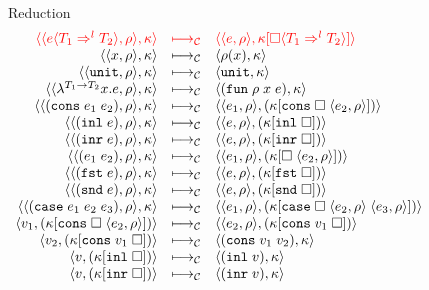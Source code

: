 \documentclass[acmsmall,review,anonymous]{acmart}\settopmatter{printfolios=true,printccs=false,printacmref=false}
\newcommand{\sOOinspect}[3]{\langle\langle#1,#2\rangle,#3\rangle}
\newcommand{\sOOreturn}[2]{\langle#1,#2\rangle}
\newcommand{\eOOvar}[1]{#1}
\newcommand{\eOOsole}[0]{\mathtt{unit}}
\newcommand{\eOOlam}[4]{\lambda^{#1\rightarrow{}#2}#3.#4}
\newcommand{\eOOapp}[2]{#1 \; #2}
\newcommand{\eOOcons}[2]{\mathtt{cons} \; #1 \; #2}
\newcommand{\eOOcar}[1]{\mathtt{fst} \; #1}
\newcommand{\eOOcdr}[1]{\mathtt{snd} \; #1}
\newcommand{\eOOinl}[1]{\mathtt{inl} \; #1}
\newcommand{\eOOinr}[1]{\mathtt{inr} \; #1}
\newcommand{\eOOcase}[3]{\mathtt{case} \; #1 \; #2 \; #3}
\newcommand{\eOOcast}[4]{#1 \langle \cOOcast{#2}{#3}{#4} \rangle}
\newcommand{\cOOcast}[3]{#1 \Rightarrow^{#2} #3}
\newcommand{\vOOfun}[3]{\mathtt{fun} \; #1 \; #2 \; #3}
\newcommand{\vOOtt}[0]{\mathtt{unit}}
\newcommand{\vOOcons}[2]{\mathtt{cons}\;#1\;#2}
\newcommand{\vOOinl}[1]{\mathtt{inl}\;#1}
\newcommand{\vOOinr}[1]{\mathtt{inr}\;#1}
\newcommand{\kOOconsI}[3]{#3[\mathtt{cons} \; \square \; \langle#1,#2\rangle ]}
\newcommand{\kOOconsII}[2]{#2[\mathtt{cons} \; #1 \; \square]}
\newcommand{\kOOinl}[1]{#1[\mathtt{inl} \; \square]}
\newcommand{\kOOinr}[1]{#1[\mathtt{inr} \; \square]}
\newcommand{\kOOappI}[3]{
	#3[\square \; \langle#1,#2\rangle ]
}
\newcommand{\kOOcar}[1]{#1[\mathtt{fst} \; \square]}
\newcommand{\kOOcdr}[1]{#1[\mathtt{snd} \; \square]}
\newcommand{\kOOcaseI}[4]{
	#4[\mathtt{case} \; \square \; \langle#1,#3\rangle \; \langle#2,#3\rangle ]}
\newcommand{\kOOcast}[2]{
	#2[\square \langle #1 \rangle]}
\newcommand{\judgeCreduce}[2]{#1 \longmapsto_{\mathcal{C}} #2}
\newcommand{\redrule}[3]{#1 & \longmapsto_\mathcal{C} & #2 & #3\\}
\newcommand{\hiredrule}[3]{\highlight{#1} & \highlight{\longmapsto_\mathcal{C}} & \highlight{#2} & \highlight{#3} \\}
\newcommand{\highlight}[1]{{\color{red} #1}}
\begin{document}
\begin{figure}
	
	\[
	\begin{array}{rclr}
	\end{array}
	\]
	
	Reduction \fbox{$\judgeCreduce{s}{s}$}
	\[
	\begin{array}{rclr}
		\hiredrule{
		\sOOinspect{\eOOcast{e}{T_1}{l}{T_2}}{\rho}{\kappa}
	}{
		\sOOinspect{e}{\rho}{
			\kOOcast{\cOOcast{T_1}{l}{T_2}}{\kappa}
		}
	}{}
	\redrule{
		\sOOinspect{\eOOvar{x}}{\rho}{\kappa}
	}{	
		\sOOreturn{\rho(x)}{\kappa}
	}{}
	\redrule{
		\sOOinspect{\eOOsole}{\rho}{\kappa}
	}{
		\sOOreturn{\vOOtt}{\kappa}
	}{}
	\redrule{
		\sOOinspect{\eOOlam{T_1}{T_2}{x}{e}}{\rho}{\kappa}
	}{
		\sOOreturn{(\vOOfun{\rho}{x}{e})}{\kappa}
	}{}
	\redrule{
		\sOOinspect{(\eOOcons{e_1}{e_2})}{\rho}{\kappa}
	}{
		\sOOinspect{e_1}{\rho}{(\kOOconsI{e_2}{\rho}{\kappa})}
	}{}
	\redrule{
		\sOOinspect{(\eOOinl{e})}{\rho}{\kappa}
	}{
		\sOOinspect{e}{\rho}{(\kOOinl{\kappa})}
	}{}
	\redrule{
	\sOOinspect{(\eOOinr{e})}{\rho}{\kappa}
	}{
	\sOOinspect{e}{\rho}{(\kOOinr{\kappa})}
	}{}
	\redrule{
		\sOOinspect{(\eOOapp{e_1}{e_2})}{\rho}{\kappa}
	}{
\sOOinspect{e_1}{\rho}{(\kOOappI{e_2}{\rho}{\kappa})}}{}

\redrule{
\sOOinspect{(\eOOcar{e})}{\rho}{\kappa}}{
\sOOinspect{e}{\rho}{(\kOOcar{\kappa})}}{}

\redrule{
	\sOOinspect{(\eOOcdr{e})}{\rho}{\kappa}}{
	\sOOinspect{e}{\rho}{(\kOOcdr{\kappa})}}{}

\redrule{
\sOOinspect{(\eOOcase{e_1}{e_2}{e_3})}{\rho}{\kappa}}{
\sOOinspect{e_1}{\rho}{(\kOOcaseI{e_2}{e_3}{\rho}{\kappa})}}{}

\redrule{
\sOOreturn{v_1}{(\kOOconsI{e_2}{\rho}{\kappa})}}{
\sOOinspect{e_2}{\rho}{(\kOOconsII{v_1}{\kappa})}}{}

\redrule{
\sOOreturn{v_2}{(\kOOconsII{v_1}{\kappa})}}{
\sOOreturn{(\vOOcons{v_1}{v_2})}{\kappa}}{}

\redrule{
\sOOreturn{v}{(\kOOinl{\kappa})}}{
\sOOreturn{(\vOOinl{v})}{\kappa}}{}

\redrule{
\sOOreturn{v}{(\kOOinr{\kappa})}}{
\sOOreturn{(\vOOinr{v})}{\kappa}}{}


\end{array}\]
\end{figure}
\end{document}
